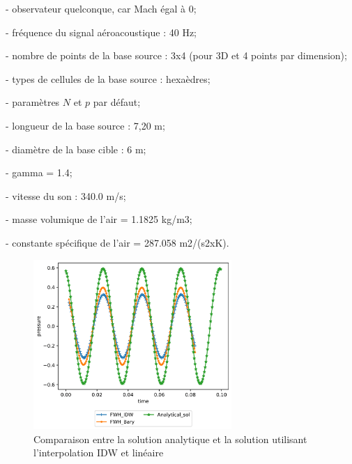 - observateur quelconque, car Mach égal à 0;

\vspace{-0,2cm}
- fréquence du signal aéroacoustique : 40 Hz;

\vspace{-0,2cm}
- nombre de points de la base source : 3x4 (pour 3D et 4 points par dimension);

\vspace{-0,2cm}
- types de cellules de la base source : hexaèdres;

\vspace{-0,2cm}
- paramètres \(N\) et \(p\) par défaut;

\vspace{-0,2cm}
- longueur de la base source : 7,20 m;

\vspace{-0,2cm}
- diamètre de la base cible : 6 m;

\vspace{-0,2cm}
- gamma = 1.4;

\vspace{-0,2cm}
- vitesse du son : 340.0 m/s;

\vspace{-0,2cm}
- masse volumique de l'air = 1.1825 kg/m3;

\vspace{-0,2cm}
- constante spécifique de l'air = 287.058 m2/(s2xK).

\begin{figure}[H]
    \centering
    \includegraphics[width=0.67\textwidth]{images/onde_aac.png}
    \caption{Comparaison entre la solution analytique et la solution utilisant l'interpolation IDW et linéaire}
    \label{fig:onde_aac}
\end{figure}

